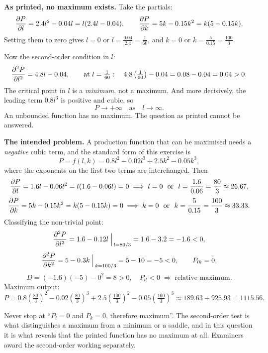 \begin{solution}
\textbf{As printed, no maximum exists.} Take the partials:
\[
\frac{\partial P}{\partial l}=2.4l^{2}-0.04l=l(2.4l-0.04),\qquad
\frac{\partial P}{\partial k}=5k-0.15k^{2}=k(5-0.15k).
\]
Setting them to zero gives $l=0$ or $l=\tfrac{0.04}{2.4}=\tfrac{1}{60}$, and
$k=0$ or $k=\tfrac{5}{0.15}=\tfrac{100}{3}$.

Now the second-order condition in $l$:
\[
\frac{\partial^{2} P}{\partial l^{2}}=4.8l-0.04, \qquad
\text{at } l=\tfrac{1}{60}: \quad 4.8\left(\tfrac{1}{60}\right)-0.04
=0.08-0.04=0.04>0 .
\]
The critical point in $l$ is a \emph{minimum}, not a maximum. And more
decisively, the leading term $0.8l^{3}$ is positive and cubic, so
\[
P\to +\infty \quad\text{as}\quad l\to\infty .
\]
An unbounded function has no maximum. The question as printed cannot be
answered.


\medskip
\textbf{The intended problem.} A production function that can be maximised needs
a \emph{negative} cubic term, and the standard form of this exercise is
\[
P=f(l,k)=0.8l^{2}-0.02l^{3}+2.5k^{2}-0.05k^{3},
\]
where the exponents on the first two terms are interchanged. Then
\[
\pd{P}{l}=1.6l-0.06l^{2}=l(1.6-0.06l)=0
\;\Longrightarrow\; l=0 \ \text{ or } \ l=\frac{1.6}{0.06}=\frac{80}{3}\approx 26.67,
\]
\[
\pd{P}{k}=5k-0.15k^{2}=k(5-0.15k)=0
\;\Longrightarrow\; k=0 \ \text{ or } \ k=\frac{5}{0.15}=\frac{100}{3}\approx 33.33 .
\]
Classifying the non-trivial point:
\[
\frac{\partial^{2} P}{\partial l^{2}}=1.6-0.12l \;\Big|_{\,l=80/3}=1.6-3.2=-1.6<0,
\]
\[
\frac{\partial^{2} P}{\partial k^{2}}=5-0.3k \;\Big|_{\,k=100/3}=5-10=-5<0,
\qquad
P_{lk}=0 ,
\]
\[
D=(-1.6)(-5)-0^{2}=8>0,\quad P_{ll}<0 \;\Longrightarrow\;
\text{relative maximum}.
\]
Maximum output:
\[
P=0.8\left(\tfrac{80}{3}\right)^{2}-0.02\left(\tfrac{80}{3}\right)^{3}
+2.5\left(\tfrac{100}{3}\right)^{2}-0.05\left(\tfrac{100}{3}\right)^{3}
\approx 189.63+925.93=1115.56 .
\]
\end{solution}

\begin{pitfall}
Never stop at ``$P_l=0$ and $P_k=0$, therefore maximum''. The second-order test
is what distinguishes a maximum from a minimum or a saddle, and in this question
it is what reveals that the printed function has no maximum at all. Examiners
award the second-order working separately.
\end{pitfall}

